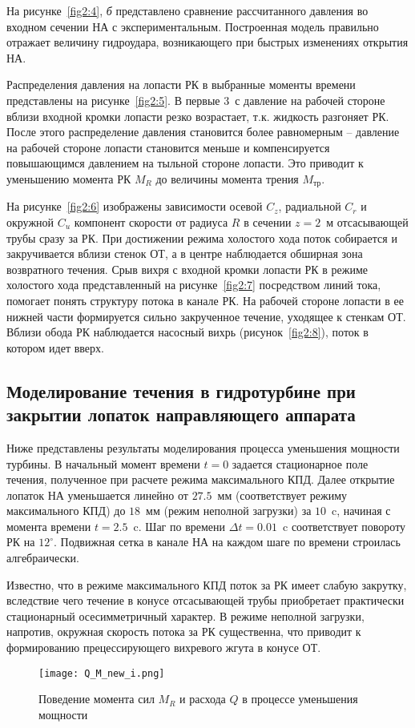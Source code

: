 На рисунке~\ref{fig2:4}, \emph{б} представлено сравнение рассчитанного давления во входном сечении НА с 
экспериментальным. Построенная модель правильно отражает величину гидроудара, возникающего 
при быстрых изменениях открытия НА.

Распределения давления на лопасти РК в выбранные моменты времени представлены на рисунке~\ref{fig2:5}. В первые 
3~с давление на рабочей стороне вблизи входной кромки лопасти резко возрастает, т.к. жидкость разгоняет РК. 
После этого распределение давления становится более равномерным -- давление на рабочей стороне лопасти 
становится меньше и компенсируется повышающимся давлением на тыльной стороне лопасти. Это приводит к 
уменьшению момента РК $M_R$ до величины момента трения $M_{\text{тр}}$.

На рисунке~\ref{fig2:6} изображены зависимости осевой $C_z$, радиальной $C_r$ и окружной $C_u$ компонент 
скорости от радиуса $R$ в сечении $z=2$~м отсасывающей трубы сразу за РК. При достижении режима холостого 
хода поток собирается и закручивается вблизи стенок ОТ, а в центре наблюдается обширная зона возвратного 
течения. Срыв вихря с входной кромки лопасти РК в режиме холостого хода представленный на 
рисунке~\ref{fig2:7} посредством линий тока, помогает понять структуру потока в канале РК. 
На рабочей стороне лопасти в ее нижней части 
формируется сильно закрученное течение, уходящее к стенкам ОТ. Вблизи обода РК наблюдается насосный вихрь 
(рисунок~\ref{fig2:8}), поток в котором идет вверх.

\subsection{Моделирование течения в гидротурбине при закрытии лопаток направляющего аппарата}
Ниже представлены результаты моделирования процесса уменьшения мощности турбины. 
В начальный момент времени $t=0$ задается стационарное поле течения, полученное при расчете режима 
максимального КПД. Далее открытие лопаток НА уменьшается линейно от $27.5$~мм (соответствует режиму 
максимального КПД) до $18$~мм (режим неполной загрузки) за $10$~c, начиная с момента времени $t=2.5$~c. 
Шаг по времени $\Delta t=0.01$~c соответствует повороту РК на $12^{\circ}$. Подвижная сетка в канале НА на 
каждом шаге по времени строилась алгебраически.

Известно, что в режиме максимального КПД поток за РК имеет слабую закрутку, вследствие чего течение в конусе 
отсасывающей трубы приобретает практически стационарный осесимметричный характер. В режиме неполной загрузки, 
напротив, окружная скорость потока за РК существенна, что приводит к формированию прецессирующего вихревого 
жгута в конусе ОТ.
\begin{figure}[b!]
  \label{fig1:9}
  \centering                                                                                   
  \texttt{[image: Q\_M\_new\_i.png]} \\
  \caption{Поведение момента сил $M_R$ и расхода $Q$ в процессе уменьшения мощности}
\end{figure}

